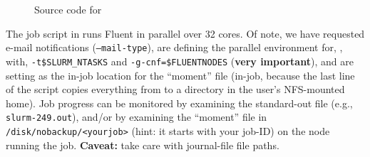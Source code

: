 
\begin{figure}[htpb]
    
    \caption{Source code for }
	\label{fig:fluent.sh}
\end{figure}

The job script in  runs Fluent in parallel over 32 cores. 
Of note, we have requested e-mail notifications (\texttt{--mail-type}), are defining the 
parallel environment for, , with, \texttt{-t\$SLURM\_NTASKS} and \texttt{-g-cnf=\$FLUENTNODES} (\textbf{very 
important}), and are setting  as the in-job location for the
``moment''  file (in-job, because the last line of the script 
copies everything from  to a directory in the user's NFS-mounted home). 
Job progress can be monitored by examining the standard-out file (e.g.,
\texttt{slurm-249.out}), and/or by examining the ``moment'' file in 
\texttt{/disk/nobackup/<yourjob>} (hint: it starts with your job-ID) on the node running
the job. \textbf{Caveat:} take care with journal-file file paths.


